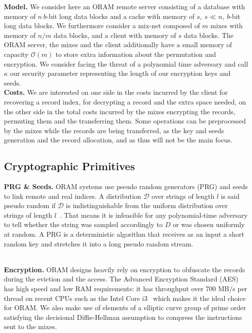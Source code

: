 \documentclass{llncs}
\begin{document}
\noindent\textbf{Model.} We consider here an ORAM remote server consisting of a database with memory of $n\ b$-bit long data blocks and a cache with memory of $s,\ s\ll n,\ b$-bit long data blocks. We furthermore consider a mix-net composed of $m$ mixes with memory of $n/m$ data blocks, and a client with memory of $s$ data blocks. The ORAM server, the mixes and the client additionally have a small memory of capacity $\mathcal{O}(m)$ to store extra information about the  permutation and encryption. We consider facing the threat of a polynomial time adversary and call $\kappa$ our security parameter representing the length of our encryption keys and seeds.\\

\noindent\textbf{Costs.} We are interested on one side in the costs incurred by the client for recovering a record index, for decrypting a record and the extra space needed, on the other side in the total costs incurred by the mixes encrypting the records, permuting them and the transferring them.
Some operations can be preprocessed by the mixes while the records are being transferred, as the key and seeds generation and the record allocation, and as thus will not be the main focus.
%
\subsection{Cryptographic Primitives}

\noindent\textbf{PRG \& Seeds.}
ORAM systems use pseudo random generators (PRG) and seeds to link remote and real indices. A distribution $\mathcal{D}$ over strings of length $l$ is said pseudo random if $\mathcal{D}$ is indistinguishable from the uniform distribution over strings of length $l$~\cite{katz2014introduction}. That means it is infeasible for any polynomial-time adversary to tell whether the string was sampled accordingly to $D$ or was chosen uniformly at random. A PRG is a deterministic algorithm that receives as an input a short random key and stretches it into a long pseudo random stream.\\\

\noindent\textbf{Encryption.}
ORAM designs heavily rely on encryption to obfuscate the records during the eviction and the  access.
The Advanced Encryption Standard (AES)~\cite{daemen2013design} has high speed and low RAM requirements: it has throughput over 700 MB/s per thread on recent CPUs such as the Intel Core i3~\cite{mcwilliams2014hardware} which makes it the ideal choice for ORAM.
We also make use of elements of a elliptic curve group of prime order satisfying the decisional Diffie-Hellman assumption to compress the instructions sent to the mixes.
\end{document}
